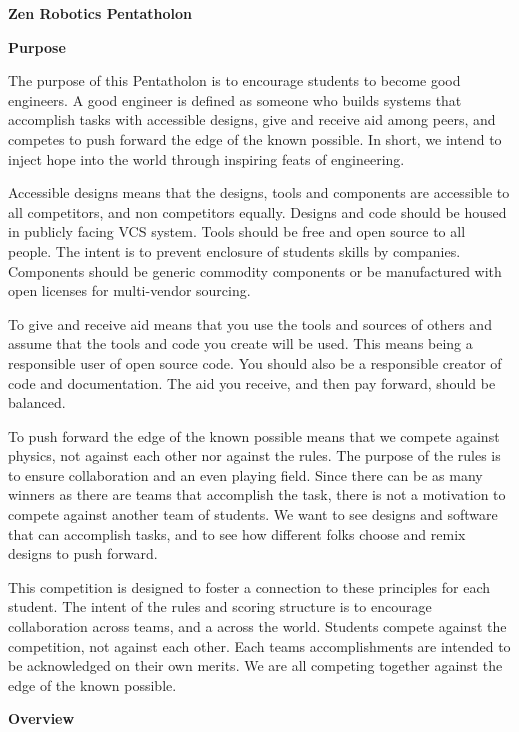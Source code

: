 \documentclass{article}
\begin{document}
	
{\huge \textbf{Zen Robotics Pentatholon}}

\vspace{1cm}

{\huge \textbf{Purpose}}
\vspace{1cm}

The purpose of this Pentatholon is to encourage students to become good engineers. A good engineer is defined as someone who builds systems that accomplish tasks with accessible designs, give and receive aid among peers, and competes to push forward the edge of the known possible. In short, we intend to inject hope into the world through inspiring feats of engineering.

Accessible designs means that the designs, tools and components are accessible to all competitors, and non competitors equally. Designs and code should be housed in publicly facing VCS system. Tools should be free and open source to all people. The intent is to prevent enclosure of students skills by companies.  Components should be generic commodity components or be manufactured with open licenses for multi-vendor sourcing.  

To give and receive aid means that you use the tools and sources of others and assume that the tools and code you create will be used. This means being a responsible user of open source code. You should also be a responsible creator of code and documentation. The aid you receive, and then pay forward, should be  balanced. 

To push forward the edge of the known possible means that we compete against physics, not against each other nor against the rules. The purpose of the rules is to ensure collaboration and an even playing field. Since there can be as many winners as there are teams that accomplish the task, there is not a motivation to compete against another team of students. We want to see designs and software that can accomplish tasks, and to see how different folks choose and remix designs to push forward. 

  
This competition is designed to foster a connection to these principles for each student. The intent of the rules and scoring structure is to encourage collaboration across teams, and a across the world. Students compete against the competition, not against each other. Each teams accomplishments are intended to be acknowledged on their own merits. We are all competing together against the edge of the known possible.
\pagebreak

{\huge \textbf{Overview}}
\vspace{1cm}
\end{document}
